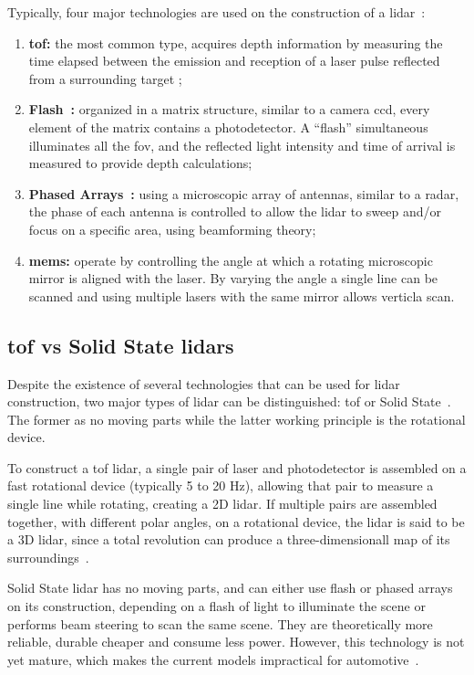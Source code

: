 Typically, four major technologies are used on the construction of a \ac{lidar}~\cite{Hecht2018, Sullg}:

\begin{enumerate}
	\item \textbf{\ac{tof}:} the most common type, acquires depth information by measuring the time elapsed between the emission and reception of a \ac{laser} pulse reflected from a surrounding target \cite{Sullivan2016};
	\item \textbf{Flash~\cite{Ouster, Gelbart2002,Stettner2010, Simpson2019}:} organized in a matrix structure, similar to a camera \ac{ccd}, every element of the matrix contains a photodetector. A ``flash'' simultaneous illuminates all the \ac{fov}, and the reflected light intensity and time of arrival is measured to provide depth calculations; 
	\item \textbf{Phased Arrays~\cite{Quanergy2018, Yu2016}:} using a microscopic array of antennas, similar to a \ac{radar}, the phase of each antenna is controlled to allow the \ac{lidar} to sweep and/or focus on a specific area, using beamforming theory;
	\item \textbf{\ac{mems}:} operate by controlling the angle at which a rotating microscopic mirror is aligned with the \ac{laser}. By varying the angle a single line can be scanned and using multiple \acp{laser} with the same mirror allows verticla scan.
\end{enumerate}


\subsection{\acl{tof} vs Solid State \acp{lidar}}
Despite the existence of several technologies that can be used for \ac{lidar} construction, two major types of \ac{lidar} can be distinguished: \ac{tof} or Solid State~\cite{Hecht2018}. The former as no moving parts while the latter working principle is the rotational device.

To construct a \ac{tof} \ac{lidar}, a single pair of \ac{laser} and photodetector is assembled on a fast rotational device (typically 5 to 20 Hz), allowing that pair to measure a single line while rotating, creating a 2D \ac{lidar}. If multiple pairs are assembled together, with different polar angles, on a rotational device, the \ac{lidar} is said to be a 3D \ac{lidar}, since a total revolution can produce a three-dimensionall map of its surroundings~\cite{Sullivan2016}.

Solid State \ac{lidar} has no moving parts, and can either use flash or phased arrays on its construction, depending on a flash of light to illuminate the scene or performs beam steering to scan the same scene. They are theoretically more reliable, durable cheaper and consume less power. However, this technology is not yet mature, which makes the current models impractical for automotive~\cite{Fersch2017a}. 

